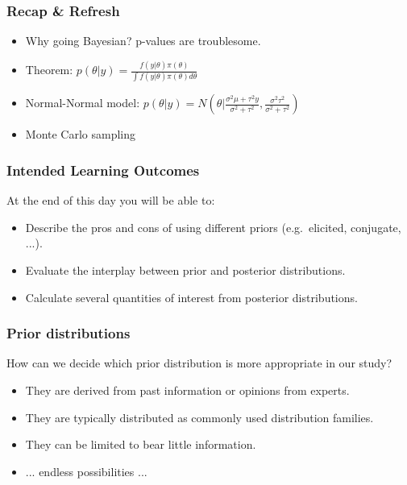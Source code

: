 \documentclass{beamer}
\newcommand{\1}{\ensuremath{\mathbf{1}}}
\begin{document}
%
%
%
\begin{frame}\frametitle{Recap \& Refresh}
	\begin{itemize}
		\item Why going Bayesian? p-values are troublesome.
		\item Theorem: $p(\theta|y) = \frac{f(y|\theta)\pi(\theta)}{\int f(y|\theta)\pi(\theta)d\theta}$
		\item Normal-Normal model: $p(\theta|y) = N( \theta | \frac{\sigma^2\mu + \tau^2 y}{\sigma^2 + \tau^2}, \frac{\sigma^2\tau^2}{\sigma^2 + \tau^2})$
		\item Monte Carlo sampling
	\end{itemize}
\end{frame}
%
%
%
\begin{frame}\frametitle{Intended Learning Outcomes}
	At the end of this day you will be able to:
	\begin{itemize}
		\item Describe the pros and cons of using different priors (e.g.\ elicited, conjugate, ...).
		\item Evaluate the interplay between prior and posterior distributions.
		\item Calculate several quantities of interest from posterior distributions.
	\end{itemize}
\end{frame}
%
%
%
\begin{frame}\frametitle{Prior distributions}
	How can we decide which prior distribution is more appropriate in our study?
	\begin{itemize}
		\item They are derived from past information or opinions from experts.
		\item They are typically distributed as commonly used distribution families.
		\item They can be limited to bear little information.
		\item ... endless possibilities ...
	\end{itemize}
\end{frame}
\end{document}
